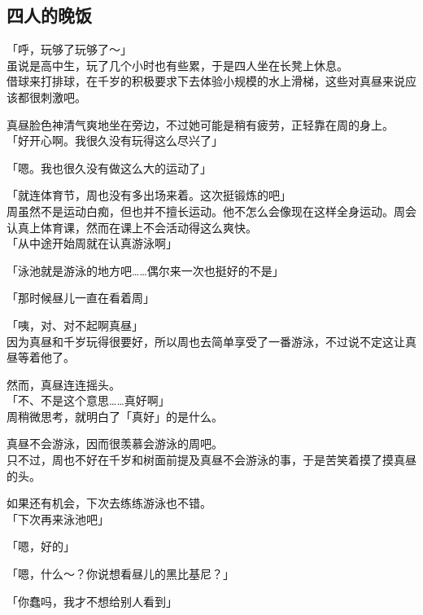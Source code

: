 \subsection{四人的晚饭}

「呼，玩够了玩够了～」\\

虽说是高中生，玩了几个小时也有些累，于是四人坐在长凳上休息。\\

借球来打排球，在千岁的积极要求下去体验小规模的水上滑梯，这些对真昼来说应该都很刺激吧。

真昼脸色神清气爽地坐在旁边，不过她可能是稍有疲劳，正轻靠在周的身上。\\

「好开心啊。我很久没有玩得这么尽兴了」

「嗯。我也很久没有做这么大的运动了」

「就连体育节，周也没有多出场来着。这次挺锻炼的吧」\\

周虽然不是运动白痴，但也并不擅长运动。他不怎么会像现在这样全身运动。周会认真上体育课，然而在课上不会活动得这么爽快。\\

「从中途开始周就在认真游泳啊」

「泳池就是游泳的地方吧……偶尔来一次也挺好的不是」

「那时候昼儿一直在看着周」

「咦，对、对不起啊真昼」\\

因为真昼和千岁玩得很要好，所以周也去简单享受了一番游泳，不过说不定这让真昼等着他了。

然而，真昼连连摇头。\\

「不、不是这个意思……真好啊」\\

周稍微思考，就明白了「真好」的是什么。

真昼不会游泳，因而很羡慕会游泳的周吧。\\

只不过，周也不好在千岁和树面前提及真昼不会游泳的事，于是苦笑着摸了摸真昼的头。

如果还有机会，下次去练练游泳也不错。\\

「下次再来泳池吧」

「嗯，好的」

「嗯，什么～？你说想看昼儿的黑比基尼？」

「你蠢吗，我才不想给别人看到」

